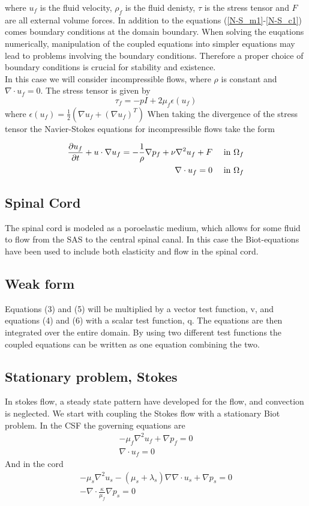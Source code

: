 where $u_f$ is the fluid velocity, $\rho_f$ is the fluid denisty, $\tau$ is the stress tensor and $F$ are all external volume forces. In addition to the equations (\ref{N-S_m1}-\ref{N-S_c1}) comes boundary conditions at the domain boundary. When solving the euqations numerically, manipulation of the coupled equations into simpler equations may lead to problems involving the boundary conditions. Therefore a proper choice of boundary conditions is crucial for stability and existence. 
\\
In this case we will consider incompressible flows, where $\rho$ is constant and $\nabla \cdot u_f = 0$. The stress tensor is given by
\[ \tau_f = -pI + 2 \mu_f \epsilon(u_f) \]
where $\epsilon(u_f) = \frac{1}{2}(\nabla u_f + (\nabla u_f)^T)$
When taking the divergence of the stress tensor the Navier-Stokes equations for incompressible flows take the form

\begin{align}
	\frac{\partial u_f}{\partial t} + u\cdot \nabla u_f = -\frac{1}{\rho}\nabla p_f + \nu \nabla ^2 u_f + F && 	\text{ in } \Omega_f 
	\\
	\nabla \cdot u_f = 0 && \text{ in } \Omega_f
\end{align}



\subsection{Spinal Cord}
The spinal cord is modeled as a poroelastic medium, which allows for some fluid to flow from the SAS to the central spinal canal. In this case the Biot-equations have been used to include both elasticity and flow in the spinal cord. 
 
\subsection{Weak form}
Equations (3) and (5) will be multiplied by a vector test function, v, and equations (4) and (6) with a scalar test function, q. The equations are then integrated over the entire domain. By using two different test functions the coupled equations can be written as one equation combining the two. \\	
\subsection{Stationary problem, Stokes}
In stokes flow, a steady state pattern have developed for the flow, and convection is neglected. We start with coupling the Stokes flow with a stationary Biot problem. In the CSF the governing equations are
\begin{align}
	- \mu_f \nabla ^2 u_f
	+ \nabla p_f
	= 0 \nonumber \\
	\nabla \cdot u_f = 0
\end{align}
And in the cord
\begin{align}
	- \mu_s \nabla^2 u_s 
	- (\mu_s + \lambda_s) \nabla \nabla \cdot u_s
	+ \nabla p_s = 0 \nonumber \\ 
	- \nabla \cdot \frac{\kappa}{\mu_f} \nabla p_s = 0
\end{align}

